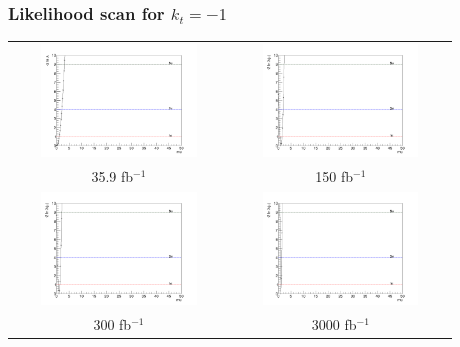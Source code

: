 \documentclass[11pt]{beamer}
\newcommand{\nologo}{\setbeamertemplate{logo}{}}
\begin{document}
{\nologo
	\begin{frame}
	\frametitle{Likelihood scan for  $k_t=-1$}
	\begin{center}
		\begin{tabular}{cc}
			\includegraphics[width=5.5cm,height=3cm]{figures/kt-1/35.9fb/Likelihood-kt-1.png} &
			\includegraphics[width=5.5cm,height=3cm]{figures/kt-1/150fb/Likelihood.png}\\ 
			\scriptsize{35.9 fb$^{-1}$} & \scriptsize{150 fb$^{-1}$} \\
			\includegraphics[width=5.5cm,height=3cm]{figures/kt-1/300fb/Likelihood.png}&
			\includegraphics[width=5.5cm,height=3cm]{figures/kt-1/3000fb/Likelihood.png}\\
			\scriptsize{300 fb$^{-1}$} & \scriptsize{3000 fb$^{-1}$} \\
		\end{tabular}
	\end{center}
\end{frame}
}
\end{document}
